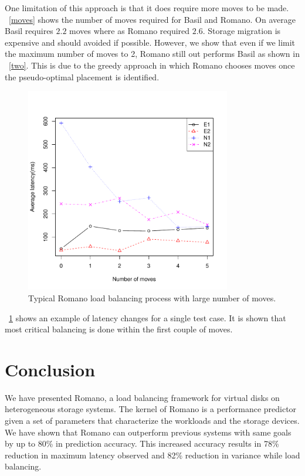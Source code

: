 One limitation of this approach is that it does require more moves to be made.
\figurename~\ref{moves} shows the number of moves required for Basil and Romano.
On average Basil requires $2.2$ moves where as Romano required $2.6$.
Storage migration is expensive and should avoided if possible.
However, we show that even if we limit the maximum number of moves to 2, Romano still out performs Basil as shown in \figurename~\ref{two}.
This is due to the greedy approach in which Romano chooses moves once the pseudo-optimal placement is identified.

\begin{figure}[!t]
\centering
\includegraphics[width=0.8\textwidth]{figure/23latency_reduction.pdf}
\captionsetup{format=myformat}
\caption{Typical Romano load balancing process with large number of moves.}
\label{proc}
\end{figure}

\figurename~\ref{proc} shows an example of latency changes for a single test case.
It is shown that most critical balancing is done within the first couple of moves.
~
\section{Conclusion}\label{CONCL}
We have presented Romano, a load balancing framework for virtual disks
on heterogeneous storage systems. The kernel of Romano is a performance
predictor given a set of parameters that characterize the workloads and
the storage devices. We have shown that Romano can outperform
previous systems with same goals by up to 80\% in prediction
accuracy. This increased accuracy results in 78\% reduction in maximum
latency observed and 82\% reduction in variance while load balancing.

